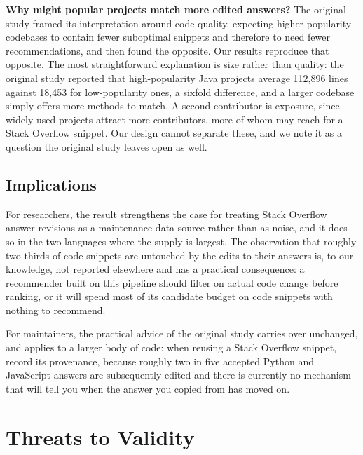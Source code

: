 \documentclass[onecolumn,11pt]{IEEEtran}
\begin{document}
\textbf{Why might popular projects match more edited answers?}
The original study framed its interpretation around code quality, expecting higher-popularity codebases to contain fewer suboptimal snippets and therefore to need fewer recommendations, and then found the opposite.
Our results reproduce that opposite.
The most straightforward explanation is size rather than quality: the original study reported that high-popularity Java projects average 112{,}896 lines against 18{,}453 for low-popularity ones, a sixfold difference, and a larger codebase simply offers more methods to match.
A second contributor is exposure, since widely used projects attract more contributors, more of whom may reach for a Stack Overflow snippet.
Our design cannot separate these, and we note it as a question the original study leaves open as well.

\subsection{Implications}

For researchers, the result strengthens the case for treating Stack Overflow answer revisions as a maintenance data source rather than as noise, and it does so in the two languages where the supply is largest.
The observation that roughly two thirds of code snippets are untouched by the edits to their answers is, to our knowledge, not reported elsewhere and has a practical consequence: a recommender built on this pipeline should filter on actual code change before ranking, or it will spend most of its candidate budget on code snippets with nothing to recommend.

For maintainers, the practical advice of the original study carries over unchanged, and applies to a larger body of code: when reusing a Stack Overflow snippet, record its provenance, because roughly two in five accepted Python and JavaScript answers are subsequently edited and there is currently no mechanism that will tell you when the answer you copied from has moved on.

\section{Threats to Validity}
\label{sec:threats}
\end{document}
